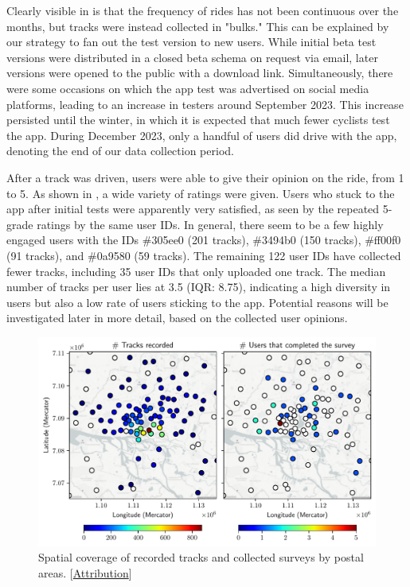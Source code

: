 Clearly visible in  is that the frequency of rides has not been continuous over the months, but tracks were instead collected in "bulks." This can be explained by our strategy to fan out the test version to new users. While initial beta test versions were distributed in a closed beta schema on request via email, later versions were opened to the public with a download link. Simultaneously, there were some occasions on which the app test was advertised on social media platforms, leading to an increase in testers around September 2023. This increase persisted until the winter, in which it is expected that much fewer cyclists test the app. During December 2023, only a handful of users did drive with the app, denoting the end of our data collection period. 

After a track was driven, users were able to give their opinion on the ride, from 1 to 5. As shown in , a wide variety of ratings were given. Users who stuck to the app after initial tests were apparently very satisfied, as seen by the repeated 5-grade ratings by the same user IDs. In general, there seem to be a few highly engaged users with the IDs \#305ee0 (201 tracks), \#3494b0 (150 tracks), \#ff00f0 (91 tracks), and \#0a9580 (59 tracks). The remaining 122 user IDs have collected fewer tracks, including 35 user IDs that only uploaded one track. The median number of tracks per user lies at 3.5 (IQR: 8.75), indicating a high diversity in users but also a low rate of users sticking to the app. Potential reasons will be investigated later in more detail, based on the collected user opinions.

\begin{figure}[t]
\caption{Spatial coverage of recorded tracks and collected surveys by postal areas. [\hyperref[attribution]{Attribution}]}\label{fig:app-spatial-distribution}
\includegraphics[width=\linewidth]{images/app-spatial-distribution.pdf}
\end{figure}

